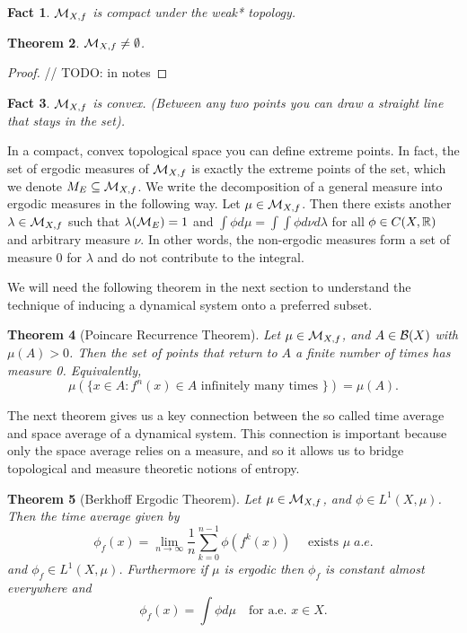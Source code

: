 \documentclass[11pt, reqno]{amsart}
\theoremstyle{plain}
\newtheorem{thm}{Theorem}[section]
\newtheorem{fact}[thm]{Fact}
\theoremstyle{definition}
\begin{document}
\begin{fact}
  $\mathcal{M}_{X,f}$ is compact under the weak* topology.
\end{fact}

\begin{thm}
  $\mathcal{M}_{X,f} \neq \emptyset$. 
\end{thm}

\begin{proof}
  // TODO: in notes
\end{proof}

\begin{fact}
  $\mathcal{M}_{X,f}$ is convex. (Between any two points you can draw a straight line that stays in the set).
\end{fact}

In a compact, convex topological space you can define extreme points. In fact, the set of ergodic measures of $\mathcal{M}_{X,f}$ is exactly the extreme points of the set, which we denote $M_E \subseteq \mathcal{M}_{X,f}$. We write the decomposition of a general measure into ergodic measures in the following way. Let $\mu \in \mathcal{M}_{X,f}$. Then there exists another $\lambda \in \mathcal{M}_{X,f}$ such that $\lambda(\mathcal{M}_E) = 1$ and $\int \phi d\mu = \int \int \phi d\nu d\lambda$ for all $\phi \in C(X, \mathbb{R})$ and arbitrary measure $\nu$. In other words, the non-ergodic measures form a set of measure 0 for $\lambda$ and do not contribute to the integral.

We will need the following theorem in the next section to understand the technique of inducing a dynamical system onto a preferred subset.
\begin{thm}[Poincare Recurrence Theorem]
  Let $\mu \in \mathcal{M}_{X,f}$, and $A \in \mathcal{B}(X)$ with $\mu(A) > 0$. Then the set of points that return to $A$ a finite number of times has measure 0. Equivalently, 
  $$\mu(\{x \in A : f^n(x) \in A \text{ infinitely many times }\}) = \mu(A).$$
\end{thm}

The next theorem gives us a key connection between the so called time average and space average of a dynamical system. This connection is important because only the space average relies on a measure, and so it allows us to bridge topological and measure theoretic notions of entropy.
\begin{thm}[Berkhoff Ergodic Theorem]
  Let $\mu \in \mathcal{M}_{X,f}$, and $\phi \in L^1(X,\mu)$. Then the time average given by 
  $$\phi_f(x) = \lim_{n \rightarrow \infty} \frac{1}{n}\sum_{k=0}^{n-1} \phi(f^k(x))\quad\text{ exists }\mu\;a.e.$$
  and $\phi_f \in L^1(X,\mu)$. Furthermore if $\mu$ is ergodic then $\phi_f$ is constant almost everywhere and 
  $$\phi_f(x) = \int \phi d\mu \quad \text{for a.e. }x \in X.$$
\end{thm}
\end{document}
